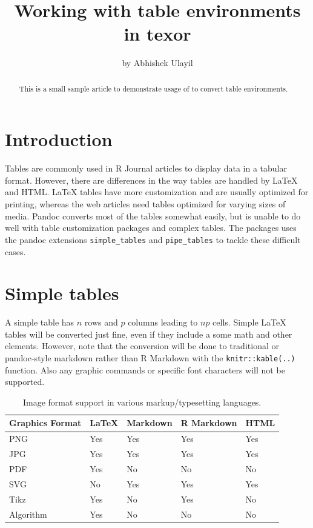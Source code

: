 \title{Working with table environments in texor}
\author{by Abhishek Ulayil}

\maketitle

\begin{abstract}
This is a small sample article to demonstrate usage of  to convert table environments.
\end{abstract}

\section{Introduction}
Tables are commonly used in R Journal articles to display data in a tabular format. However, there are differences in the way tables are handled by LaTeX and HTML.
LaTeX tables have more customization and are usually optimized for printing, whereas the web articles need tables optimized for varying sizes of media.
Pandoc converts most of the tables somewhat easily, but is unable to do well with table customization packages and complex tables.
The  packages uses the pandoc extensions \verb|simple_tables| and \verb|pipe_tables| to tackle these difficult cases.

\section{Simple tables}

A simple table has $n$ rows and $p$ columns leading to $np$ cells.
Simple LaTeX tables will be converted just fine, even if they include a some math and other elements.
However, note that the conversion will be done to traditional or pandoc-style markdown rather than R Markdown with the \verb|knitr::kable(..)| function. Also any graphic commands or specific font characters will
not be supported.
\begin{table}[htbp]
\centering
\begin{tabular}{l | llll }
 \hline
 Graphics Format & LaTeX & Markdown & R Markdown & HTML \\
 \hline
 PNG       & Yes & Yes & Yes & Yes \\
 JPG       & Yes & Yes & Yes & Yes \\
 PDF       & Yes & No & No & No \\
 SVG       & No & Yes & Yes & Yes \\
 Tikz      & Yes & No & Yes & No \\
 Algorithm & Yes & No & No & No \\
\hline
\end{tabular}
\caption{Image format support in various markup/typesetting languages.}
\label{table:1}
\end{table}

